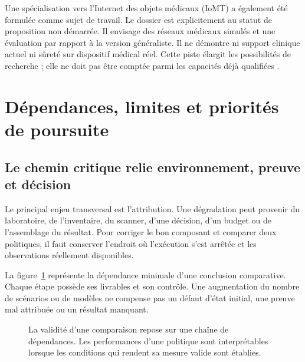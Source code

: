 \documentclass[11pt,a4paper]{article}
\begin{document}
Une spécialisation vers l'Internet des objets médicaux (IoMT) a également été
formulée comme sujet de travail. Le dossier est explicitement au statut de
proposition non démarrée. Il envisage des réseaux médicaux simulés et une
évaluation par rapport à la version généraliste. Il ne démontre ni support
clinique actuel ni sûreté sur dispositif médical réel. Cette piste élargit les
possibilités de recherche ; elle ne doit pas être comptée parmi les capacités
déjà qualifiées \cite{syn-iomt}.

\section{Dépendances, limites et priorités de poursuite}
\label{sec:priorites}
\subsection{Le chemin critique relie environnement, preuve et décision}
Le principal enjeu transversal est l'attribution. Une dégradation peut provenir
du laboratoire, de l'inventaire, du scanner, d'une décision, d'un budget ou de
l'assemblage du résultat. Pour corriger le bon composant et comparer deux
politiques, il faut conserver l'endroit où l'exécution s'est arrêtée et les
observations réellement disponibles.

La figure~\ref{fig:syn-dependances} représente la dépendance minimale d'une
conclusion comparative. Chaque étape possède ses livrables et son contrôle.
Une augmentation du nombre de scénarios ou de modèles ne compense pas un
défaut d'état initial, une preuve mal attribuée ou un résultat manquant.

\begin{figure}[htbp]
\centering
{}
\caption{La validité d'une comparaison repose sur une chaîne de dépendances.
Les performances d'une politique sont interprétables lorsque les conditions
qui rendent sa mesure valide sont établies.}
\label{fig:syn-dependances}
\end{figure}
\end{document}
